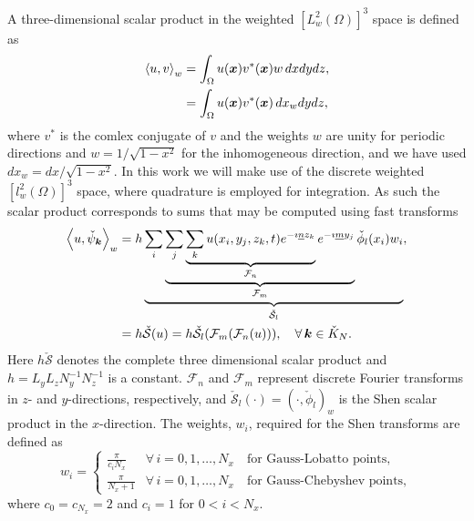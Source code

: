 \documentclass[11pt, oneside]{article}
\newcommand{\N}[1]{\check{#1}}
\begin{document}
A three-dimensional scalar product in the weighted $[L^2_w(\Omega)]^3$ space is defined as
\begin{align}
 \left<u, v\right>_w &= \int_{\Omega} {u(\bm{x}) v^*(\bm{x})}w\,dxdydz, \notag \\
   &= \int_{\Omega} {u(\bm{x}) v^*(\bm{x})}\,dx_wdydz,
\end{align}
where $v^*$ is the comlex conjugate of $v$ and the weights $w$ are unity for periodic directions and  $w=1/\sqrt{1-x^2}$ for the inhomogeneous direction, and we have used $dx_w = dx/\sqrt{1-x^2}$. In this work we will make use of the discrete weighted $[l^2_w(\Omega)]^3$ space, where quadrature is employed for integration. As such the scalar product corresponds to sums that may be computed using fast transforms
\begin{align}
 \left< u, \N{\psi}_{\bm{k}} \right>_w &= h \underbrace{\sum_i 
 \underbrace{\sum_j \underbrace{\sum_k u(x_i, y_j, z_k, t)  e^{-\imath 
 \underline{n} z_k}}_{\mathcal{F}_n}  e^{-\imath \underline{m} y_j} 
 }_{\mathcal{F}_m} \N{\phi}_{l}(x_i) w_i}_{\N{\mathcal{S}}_l},   \notag \\
  &=  h \N{\mathcal{S}}(u) = h \N{\mathcal{S}}_{l} (\mathcal{F}_{{m}} 
  (\mathcal{F}_{{n}}(u))), \quad \forall \, \bm{k} \in \N{K}_N. \label{eq:sst1}
\end{align}
Here $h\N{\mathcal{S}}$ denotes the complete three dimensional scalar product 
and $h = L_yL_zN_y^{-1}N_z^{-1}$ is a constant. $\mathcal{F}_{{n}}$ and 
$\mathcal{F}_{{m}}$ represent discrete Fourier transforms in $z$- and 
$y$-directions, respectively, and $\N{\mathcal{S}}_{l}(\cdot) = (\cdot, 
\N{\phi}_l)_w$ is the Shen scalar product in the $x$-direction. The weights, 
$w_i$, required for the Shen transforms are 
defined as
\begin{equation}
 w_i = \begin{cases}
       \frac{\pi}{c_i N_x} &\forall \, i=0,1,\ldots, N_x \quad  \text{for 
       Gauss-Lobatto points},\\
       \frac{\pi}{N_x+1} &\forall \, i=0,1,\ldots, N_x  \quad \text{for 
       Gauss-Chebyshev points},      
 \end{cases}
\end{equation}
where $c_0 = c_{N_x} = 2$ and $c_i = 1$ for $0 < i < N_x$.
\end{document}
